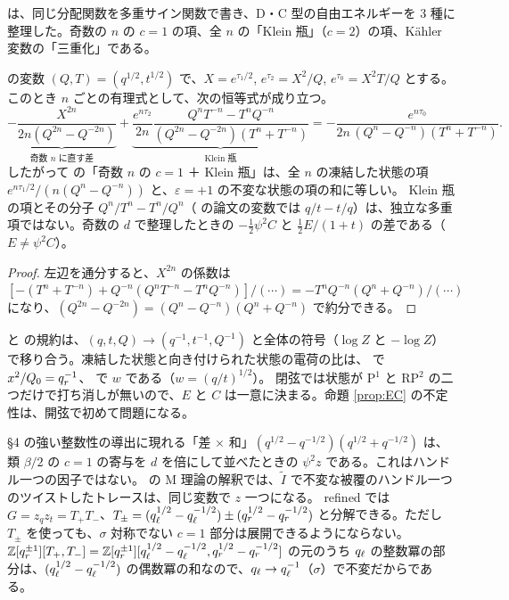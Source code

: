 \cite{AM22} は、同じ分配関数を多重サイン関数で書き、D・C 型の自由エネルギーを 3 種に整理した。奇数の $n$ の $c = 1$ の項、全 $n$ の「Klein 瓶」（$c = 2$）の項、Kähler 変数の「三重化」である。
\begin{proposition}\label{prop:AM}
\cite{AM22} の変数 $(Q, T) = (q^{1/2}, t^{1/2})$ で、$X = e^{\tau_1/2}$, $e^{\tau_2} = X^2/Q$, $e^{\tau_0} = X^2 T/Q$ とする。このとき $n$ ごとの有理式として、次の恒等式が成り立つ。
\[
\underbrace{-\frac{X^{2n}}{2n(Q^{2n} - Q^{-2n})}}_{\text{奇数 $n$ に直す差}}
+ \underbrace{\frac{e^{n\tau_2}}{2n}\frac{Q^n T^{-n} - T^n Q^{-n}}{(Q^{2n} - Q^{-2n})(T^n + T^{-n})}}_{\text{Klein 瓶}}
= -\frac{e^{n\tau_0}}{2n\,(Q^n - Q^{-n})(T^n + T^{-n})} .
\]
したがって \cite{AM22} の「奇数 $n$ の $c = 1$ ＋ Klein 瓶」は、全 $n$ の凍結した状態の項 $e^{n\tau_1/2}/(n(Q^n - Q^{-n}))$ と、$\varepsilon = +1$ の不変な状態の項の和に等しい。
Klein 瓶の項とその分子 $Q^n/T^n - T^n/Q^n$（\cite{AM22} の論文の変数では $q/t - t/q$）は、独立な多重項ではない。奇数の $d$ で整理したときの $-\tfrac12\psi^2 C$ と $\tfrac12 E/(1+t)$ の差である（$E \ne \psi^2 C$）。
\end{proposition}
\begin{proof}
左辺を通分すると、$X^{2n}$ の係数は $[-(T^n + T^{-n}) + Q^{-n}(Q^nT^{-n} - T^nQ^{-n})]/(\cdots) = -T^nQ^{-n}(Q^n + Q^{-n})/(\cdots)$ になり、$(Q^{2n} - Q^{-2n}) = (Q^n - Q^{-n})(Q^n + Q^{-n})$ で約分できる。
\end{proof}

\begin{remark}
\cite{AM22} と \cite{AgSc12} の規約は、$(q, t, Q) \to (q^{-1}, t^{-1}, Q^{-1})$ と全体の符号（$\log Z$ と $-\log Z$）で移り合う。凍結した状態と向き付けられた状態の電荷の比は、\cite{AgSc12} で $x^2/Q_0 = q_r^{-1}$、\cite{AM22} で $w$ である（$w = (q/t)^{1/2}$）。
閉弦では状態が P$^1$ と RP$^2$ の二つだけで打ち消しが無いので、$E$ と $C$ は一意に決まる。命題 \ref{prop:EC} の不定性は、開弦で初めて問題になる。
\end{remark}

\begin{remark}[ハンドルの因子]
\cite{AgSc12} §4 の強い整数性の導出に現れる「差 $\times$ 和」$(q^{1/2} - q^{-1/2})(q^{1/2} + q^{-1/2})$ は、類 $\beta/2$ の $c = 1$ の寄与を $d$ を倍にして並べたときの $\psi^2 z$ である。これはハンドル一つの因子ではない。
\cite{PU14} の M 理論の解釈では、$\tilde I$ で不変な被覆のハンドル一つのツイストしたトレースは、同じ変数で $z$ 一つになる。
refined では $G = z_q z_t = T_+T_-$、$T_\pm = (q_\ell^{1/2} - q_\ell^{-1/2}) \pm (q_r^{1/2} - q_r^{-1/2})$ と分解できる。ただし $T_\pm$ を使っても、$\sigma$ 対称でない $c = 1$ 部分は展開できるようにならない。
$\mathbb{Z}[q_r^{\pm 1}][T_+, T_-] = \mathbb{Z}[q_r^{\pm1}][q_\ell^{1/2} - q_\ell^{-1/2}, q_r^{1/2} - q_r^{-1/2}]$ の元のうち $q_\ell$ の整数冪の部分は、$(q_\ell^{1/2} - q_\ell^{-1/2})$ の偶数冪の和なので、$q_\ell \to q_\ell^{-1}$（$\sigma$）で不変だからである。
\end{remark}

